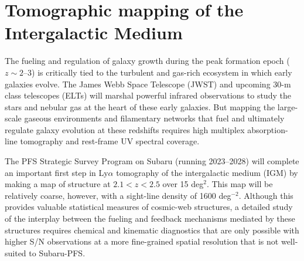 \documentclass[11pt,a4paper,twoside,onecolumn,openany,final,oldfontcommands]{memoir}
\begin{document}

  


\section{Tomographic mapping of the Intergalactic Medium}

The fueling and regulation of galaxy growth during the peak formation epoch ($z \sim2$--3) is critically tied to the turbulent and gas-rich ecosystem in which early galaxies evolve. The James Webb Space Telescope (JWST) and upcoming 30-m class telescopes (ELTs) will marshal powerful infrared observations to study the stars and nebular gas at the heart of these early galaxies. But mapping the large-scale gaseous environments and filamentary networks that fuel and ultimately regulate galaxy evolution at these redshifts requires high multiplex absorption-line tomography and rest-frame UV spectral coverage.


The PFS Strategic Survey Program on Subaru (running 2023--2028)  will complete an important first step in Ly$\alpha$ tomography of the intergalactic medium (IGM) by making a map of structure at $2.1 < z < 2.5$ over 15 deg$^2$.  This map will be relatively coarse, however, with a sight-line density of 1600 deg$^{-2}$.  Although this provides valuable statistical measures of cosmic-web structures, a detailed study of the interplay between the fueling and feedback mechanisms mediated by these structures requires chemical and kinematic diagnostics that are only possible with higher S/N observations at a more fine-grained spatial resolution that is not well-suited to Subaru-PFS.
\end{document}
